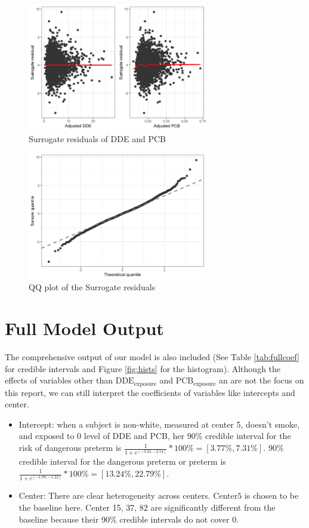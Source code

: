 \documentclass[10pt]{jmlr}%
\begin{document}
\begin{figure}
	\centering
	\includegraphics[width=0.7\textwidth]{Surrogate_residuals.png}
	\caption{Surrogate residuals of DDE and PCB}
	\label{fig:surrogateresid}
\end{figure}

\begin{figure}
	\centering
	\includegraphics[width=0.7\textwidth]{qqplot.png}
	\caption{QQ plot of the Surrogate residuals}
	\label{fig:qqplot}
\end{figure}

\section{Full Model Output}
The comprehensive output of our model is also included (See Table \ref{tab:fullcoef} for credible intervals and Figure \ref{fig:hists} for the histogram). Although the effects of variables other than $\text{DDE}_{\text{exposure}}$ and $\text{PCB}_{\text{exposure}}$ an are not the focus on this report, we can still interpret the coefficients of variables like intercepts and center. 
\begin{itemize}
	\item Intercept: when a subject is non-white, measured at center 5, doesn't smoke, and exposed to 0 level of DDE and PCB, her 90\% credible interval for the risk of dangerous preterm is $\frac{1}{1+e^{[-3.24, -2.54]}}*100\%=[3.77\%, 7.31\%]$.  90\% credible interval for the dangerous preterm or preterm is $\frac{1}{1+e^{[-1.88, -1.22]}}*100\%=[13.24\%, 22.79\%]$.
	
	\item Center: There are clear heterogeneity across centers. Center$5$ is chosen to be the baseline here. Center 15, 37, 82 are significantly different from the baseline because their 90\% credible intervals do not cover 0.
\end{itemize}
\end{document}
